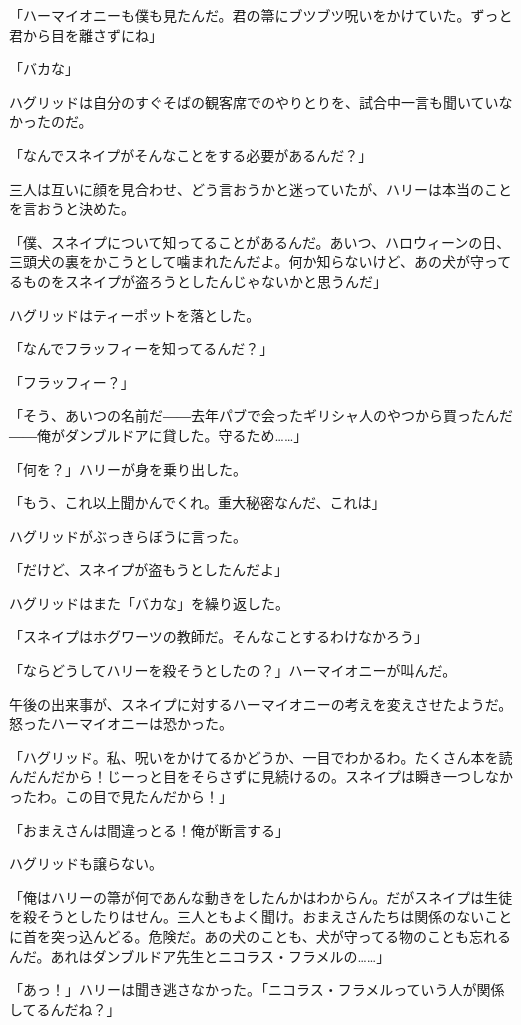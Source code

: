 \documentclass[10pt,a4paper]{article}
\begin{document}
\begin{CJK}{UTF8}{min}
「ハーマイオニーも僕も見たんだ。君の箒にブツブツ呪いをかけていた。ずっと君から目を離さずにね」

「バカな」

ハグリッドは自分のすぐそばの観客席でのやりとりを、試合中一言も聞いていなかったのだ。

「なんでスネイプがそんなことをする必要があるんだ？」

三人は互いに顔を見合わせ、どう言おうかと迷っていたが、ハリーは本当のことを言おうと決めた。

「僕、スネイプについて知ってることがあるんだ。あいつ、ハロウィーンの日、三頭犬の裏をかこうとして噛まれたんだよ。何か知らないけど、あの犬が守ってるものをスネイプが盗ろうとしたんじゃないかと思うんだ」

ハグリッドはティーポットを落とした。

「なんでフラッフィーを知ってるんだ？」

「フラッフィー？」

「そう、あいつの名前だ――去年パブで会ったギリシャ人のやつから買ったんだ――俺がダンブルドアに貸した。守るため……」

「何を？」ハリーが身を乗り出した。

「もう、これ以上聞かんでくれ。重大秘密なんだ、これは」

ハグリッドがぶっきらぼうに言った。

「だけど、スネイプが盗もうとしたんだよ」

ハグリッドはまた「バカな」を繰り返した。

「スネイプはホグワーツの教師だ。そんなことするわけなかろう」

「ならどうしてハリーを殺そうとしたの？」ハーマイオニーが叫んだ。

午後の出来事が、スネイプに対するハーマイオニーの考えを変えさせたようだ。怒ったハーマイオニーは恐かった。

「ハグリッド。私、呪いをかけてるかどうか、一目でわかるわ。たくさん本を読んだんだから！じーっと目をそらさずに見続けるの。スネイプは瞬き一つしなかったわ。この目で見たんだから！」

「おまえさんは間違っとる！俺が断言する」

ハグリッドも譲らない。

「俺はハリーの箒が何であんな動きをしたんかはわからん。だがスネイプは生徒を殺そうとしたりはせん。三人ともよく聞け。おまえさんたちは関係のないことに首を突っ込んどる。危険だ。あの犬のことも、犬が守ってる物のことも忘れるんだ。あれはダンブルドア先生とニコラス・フラメルの……」

「あっ！」ハリーは聞き逃さなかった。「ニコラス・フラメルっていう人が関係してるんだね？」


\end{CJK}
\end{document}
